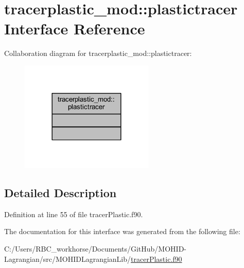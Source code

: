 \hypertarget{interfacetracerplastic__mod_1_1plastictracer}{}\section{tracerplastic\+\_\+mod\+:\+:plastictracer Interface Reference}
\label{interfacetracerplastic__mod_1_1plastictracer}


Collaboration diagram for tracerplastic\+\_\+mod\+:\+:plastictracer\+:\nopagebreak
\begin{figure}[H]
\begin{center}
\leavevmode
\includegraphics[width=180pt]{interfacetracerplastic__mod_1_1plastictracer__coll__graph}
\end{center}
\end{figure}


\subsection{Detailed Description}


Definition at line 55 of file tracer\+Plastic.\+f90.



The documentation for this interface was generated from the following file\+:\begin{DoxyCompactItemize}
\item 
C\+:/\+Users/\+R\+B\+C\+\_\+workhorse/\+Documents/\+Git\+Hub/\+M\+O\+H\+I\+D-\/\+Lagrangian/src/\+M\+O\+H\+I\+D\+Lagrangian\+Lib/\mbox{\hyperlink{tracer_plastic_8f90}{tracer\+Plastic.\+f90}}\end{DoxyCompactItemize}
